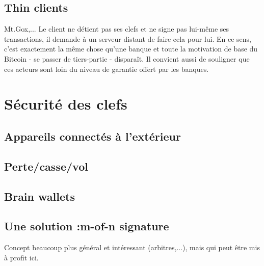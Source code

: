 \documentclass[11pt,a4paper]{article}
\begin{document}
\subsection{Thin clients}
Mt.Gox,...
Le client ne détient pas ses clefs et ne signe pas lui-même ses transactions, il demande à un serveur distant de faire cela pour lui. En ce sens, c'est exactement la même chose qu'une banque et toute la motivation de base du Bitcoin - se passer de tiers-partie - disparaît. Il convient aussi de souligner que ces acteurs sont loin du niveau de garantie offert par les banques.

\section{Sécurité des clefs}
\subsection{Appareils connectés à l'extérieur}
\subsection{Perte/casse/vol}
\subsection{Brain wallets}
\subsection{Une solution :m-of-n signature}
Concept beaucoup plus général et intéressant (arbitres,...), mais qui peut être mis à profit ici.
{}

\end{document}
